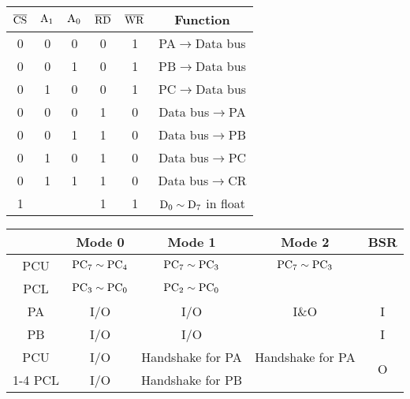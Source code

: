 \begin{table*}
\begin{minipage}{0.4\textwidth}
	\centering
	\caption{8255 功能信号}
\begin{tabular}{|ccc|cc|c|}
	\hline
	$\rm \overline{CS}$ & $\rm A_1$ & $\rm A_0$ & $\rm \overline{RD}$ & $\rm \overline{WR}$ &\bfseries Function \\
	\hline
	0 & 0 & 0 & 0 & 1 & PA$\rightarrow$Data bus \\
	\hline
	0 & 0 & 1 & 0 & 1 & PB$\rightarrow$Data bus \\
	\hline
	0 & 1 & 0 & 0 & 1 & PC$\rightarrow$Data bus \\
	\hline
	0 & 0 & 0 & 1 & 0 & Data bus$\rightarrow$PA \\
	\hline
	0 & 0 & 1 & 1 & 0 & Data bus$\rightarrow$PB \\
	\hline
	0 & 1 & 0 & 1 & 0 & Data bus$\rightarrow$PC \\
	\hline
	0 & 1 & 1 & 1 & 0 & Data bus$\rightarrow$CR \\
	\hline
	1 &  &  & 1 & 1 & $\rm D_0 \sim D_7$ in float \\
	\hline
\end{tabular}
\end{minipage}
\begin{minipage}{0.6\textwidth}
	\centering
	\caption{8255 模式}
	\begin{tabular}{|c|c|c|c|c|}
		\hline
		&\bfseries Mode 0 &\bfseries Mode 1 &\bfseries Mode 2 &\bfseries BSR \\
		\hline\hline
		PCU & $\rm PC_7 \sim PC_4$ & $\rm PC_7 \sim PC_3$ & $\rm PC_7 \sim PC_3$&  \\
		\hline
		PCL &$\rm PC_3 \sim PC_0$&$\rm PC_2 \sim PC_0$&  &  \\
		\hline\hline
		PA & I/O & I/O & I\&O & I \\
		\hline
		PB & I/O & I/O &  & I \\
		\hline
		PCU & I/O & Handshake for PA & Handshake for PA &\multirow{2}{*}{O}\\
		\cline{1-4}
		PCL & I/O & Handshake for PB &  & \\
		\hline
	\end{tabular}
\end{minipage}


\end{table*}
